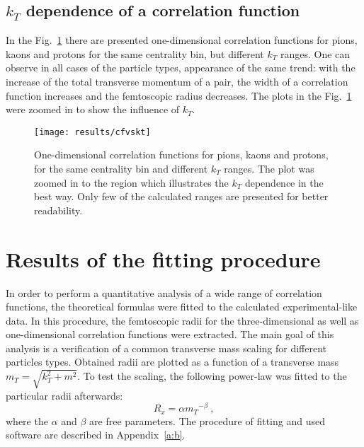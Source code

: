     \subsection{$k_T$ dependence of a correlation function}
      In the Fig.~\ref{fig:kt_dep} there are presented one-dimensional correlation functions for pions, kaons and protons for the same centrality bin, but different $k_T$ ranges.
      One can observe in all cases of the particle types, appearance of the same trend: with the increase of the total transverse momentum of a pair, the width of a correlation function increases and the femtoscopic radius decreases.
      The plots in the Fig.~\ref{fig:kt_dep} were zoomed in to show the influence of $k_T$.

      \begin{figure}[h]
        \centering
        \centerline{\texttt{[image: results/cfvskt]}}
        \caption{One-dimensional correlation functions for pions, kaons and protons, for the same centrality bin and different $k_T$ ranges. The plot was zoomed in to the region which illustrates the $k_T$ dependence in the best way. Only few of the calculated ranges are presented for better readability.}
      \label{fig:kt_dep}
      \end{figure}
    \FloatBarrier
    \clearpage
  \section{Results of the fitting procedure}
    In order to perform a quantitative analysis of a wide range of correlation functions, the theoretical formulas were fitted to the calculated experimental-like data.
    In this procedure, the femtoscopic radii for the three-dimensional as well as one-dimensional correlation functions were extracted.
    The main goal of this analysis is a verification of a common transverse mass scaling for different particles types.
    Obtained radii are plotted as a function of a transverse mass $m_T = \sqrt{k_T^2 +m^2}$.
    To test the scaling, the following power-law was fitted to the particular radii afterwards:
    \begin{equation}
      \label{eq:power-law}
      R_x = \alpha {m_T}^{-\beta}~,
    \end{equation}
    where the $\alpha$ and $\beta$ are free parameters.
    The procedure of fitting and used software are described in Appendix~\ref{a:b}.
